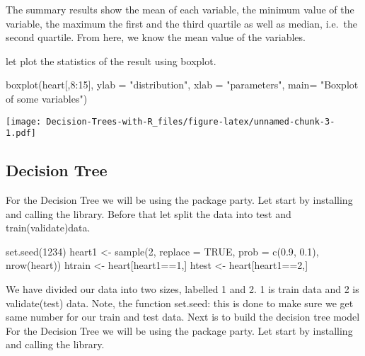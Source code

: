 \documentclass[
]{article}
\newenvironment{Shaded}{\begin{snugshade}}{\end{snugshade}}
\newcommand{\AttributeTok}[1]{\textcolor[rgb]{0.77,0.63,0.00}{#1}}
\newcommand{\ConstantTok}[1]{\textcolor[rgb]{0.00,0.00,0.00}{#1}}
\newcommand{\DecValTok}[1]{\textcolor[rgb]{0.00,0.00,0.81}{#1}}
\newcommand{\FloatTok}[1]{\textcolor[rgb]{0.00,0.00,0.81}{#1}}
\newcommand{\FunctionTok}[1]{\textcolor[rgb]{0.00,0.00,0.00}{#1}}
\newcommand{\NormalTok}[1]{#1}
\newcommand{\OtherTok}[1]{\textcolor[rgb]{0.56,0.35,0.01}{#1}}
\newcommand{\SpecialCharTok}[1]{\textcolor[rgb]{0.00,0.00,0.00}{#1}}
\newcommand{\StringTok}[1]{\textcolor[rgb]{0.31,0.60,0.02}{#1}}
\begin{document}
The summary results show the mean of each variable, the minimum value of
the variable, the maximum the first and the third quartile as well as
median, i.e.~the second quartile. From here, we know the mean value of
the variables.

let plot the statistics of the result using boxplot.

\begin{Shaded}
\begin{Highlighting}[]
\FunctionTok{boxplot}\NormalTok{(heart[,}\DecValTok{8}\SpecialCharTok{:}\DecValTok{15}\NormalTok{], }\AttributeTok{ylab =} \StringTok{"distribution"}\NormalTok{, }\AttributeTok{xlab =} \StringTok{"parameters"}\NormalTok{, }\AttributeTok{main=} \StringTok{"Boxplot of some variables"}\NormalTok{)}
\end{Highlighting}
\end{Shaded}

\texttt{[image: Decision-Trees-with-R\_files/figure-latex/unnamed-chunk-3-1.pdf]}

\hypertarget{decision-tree}{%
\subsection{Decision Tree}\label{decision-tree}}

For the Decision Tree we will be using the package party. Let start by
installing and calling the library. Before that let split the data into
test and train(validate)data.

\begin{Shaded}
\begin{Highlighting}[]
\FunctionTok{set.seed}\NormalTok{(}\DecValTok{1234}\NormalTok{)}
\NormalTok{heart1 }\OtherTok{\textless{}{-}} \FunctionTok{sample}\NormalTok{(}\DecValTok{2}\NormalTok{, }\AttributeTok{replace =} \ConstantTok{TRUE}\NormalTok{, }\AttributeTok{prob =} \FunctionTok{c}\NormalTok{(}\FloatTok{0.9}\NormalTok{, }\FloatTok{0.1}\NormalTok{), }\FunctionTok{nrow}\NormalTok{(heart))}
\NormalTok{htrain }\OtherTok{\textless{}{-}}\NormalTok{ heart[heart1}\SpecialCharTok{==}\DecValTok{1}\NormalTok{,]}
\NormalTok{htest }\OtherTok{\textless{}{-}}\NormalTok{ heart[heart1}\SpecialCharTok{==}\DecValTok{2}\NormalTok{,]}
\end{Highlighting}
\end{Shaded}

We have divided our data into two sizes, labelled 1 and 2. 1 is train
data and 2 is validate(test) data. Note, the function set.seed: this is
done to make sure we get same number for our train and test data. Next
is to build the decision tree model For the Decision Tree we will be
using the package party. Let start by installing and calling the
library.
\end{document}

